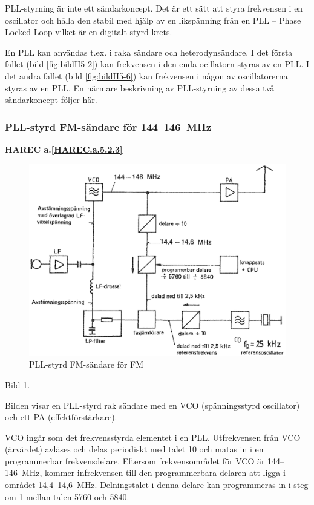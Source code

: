 PLL-styrning är inte ett sändarkoncept. Det är ett sätt att styra
frekvensen i en oscillator och hålla den stabil med hjälp av en
likspänning från en PLL -- Phase Locked Loop vilket är en digitalt
styrd krets.

En PLL kan användas t.ex. i raka sändare och heterodynsändare. I det
första fallet (bild \ref{fig:bildII5-2}) kan frekvensen i den enda ocillatorn
styras av en PLL. I det andra fallet (bild \ref{fig:bildII5-6}) kan frekvensen i
någon av oscillatorerna styras av en PLL.  En närmare beskrivning av
PLL-styrning av dessa två sändarkoncept följer här.

\subsubsection{PLL-styrd FM-sändare för 144--146~MHz}
\textbf{
HAREC a.\ref{HAREC.a.5.2.3}\label{myHAREC.a.5.2.3}
}

\begin{figure}
  \includegraphics[width=\textwidth]{images/cropped_pdfs/bild_2_5-07.pdf}
  \caption{PLL-styrd FM-sändare för FM}
  \label{fig:bildII5-7}
\end{figure}

Bild \ref{fig:bildII5-7}.

Bilden visar en PLL-styrd rak sändare med en VCO (spänningsstyrd
oscillator) och ett PA (effektförstärkare).

VCO ingår som det frekvensstyrda elementet i en PLL. Utfrekvensen från
VCO (ärvärdet) avläses och delas periodiskt med talet 10 och matas in
i en programmerbar frekvensdelare. Eftersom frekvensområdet för VCO är
144--146~MHz, kommer infrekvensen till den programmerbara delaren att
ligga i området 14,4--14,6~MHz. Delningstalet i denna delare kan
programmeras in i steg om 1 mellan talen 5760 och 5840.

